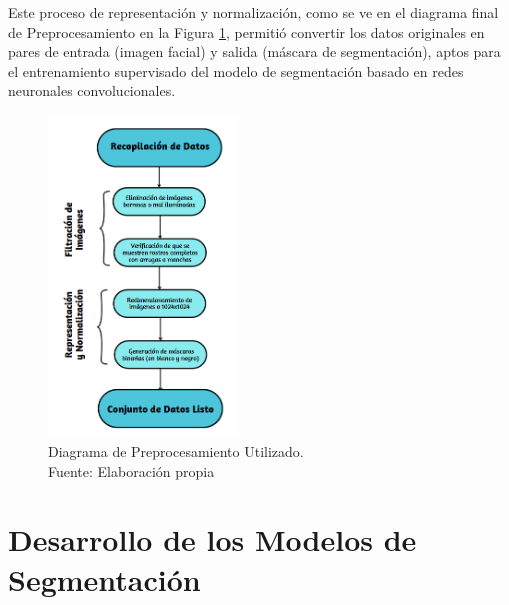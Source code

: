 Este proceso de representación y normalización, como se ve en el diagrama final de Preprocesamiento en la Figura \ref{4:fig3}, permitió convertir los datos originales en pares de entrada (imagen facial) y salida (máscara de segmentación), aptos para el entrenamiento supervisado del modelo de segmentación basado en redes neuronales convolucionales.

\begin{figure}[h]
	\begin{center}
		\includegraphics[width=0.45\textwidth]{4/figures/diagrama final prepo.png}
		\caption[Diagrama de Preprocesamiento Utilizado]{Diagrama de Preprocesamiento Utilizado.\\
		Fuente: Elaboración propia}
		\label{4:fig3}
	\end{center}
\end{figure}
\clearpage
\newpage
\section{Desarrollo de los Modelos de Segmentación}

